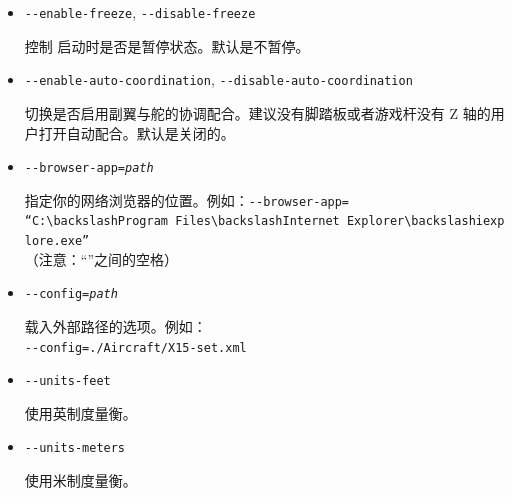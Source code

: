 {\begin{itemize}
\item{\texttt{-$ $-enable-freeze}, \texttt{-$ $-disable-freeze}}

  控制 \FlightGear{} 启动时是否是暂停状态。默认是不暂停。

\item{\texttt{-$ $-enable-auto-coordination}, \texttt{-$ $-disable-auto-coordination}}

  切换是否启用副翼与舵的协调配合。建议没有脚踏板或者游戏杆没有 Z 轴的用户打开自动配合。默认是关闭的。

\item{\texttt{-$ $-browser-app={\it path}}}

  指定你的网络浏览器的位置。例如：\texttt{-$ $-browser-app=}\\
    \texttt{``C:$\backslash$Program~Files$\backslash$Internet~Explorer$\backslash$iexplore.exe''}\\
    （注意：“”之间的空格）

\item{\texttt{-$ $-config={\it path}}}

  载入外部路径的选项。例如：\\
    \texttt{-$ $-config=./Aircraft/X15-set.xml}

\item{\texttt{-$ $-units-feet}}

  使用英制度量衡。

\item{\texttt{-$ $-units-meters}}

  使用米制度量衡。

\end{itemize}
  
}
\fi




